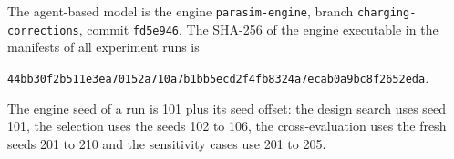 The agent-based model is the engine \texttt{parasim-engine}, branch \texttt{charging-corrections}, commit \texttt{fd5e946}. The SHA-256 of the engine executable in the manifests of all experiment runs is
\begin{center}
    \texttt{44bb30f2b511e3ea70152a710a7b1bb5ecd2f4fb8324a7ecab0a9bc8f2652eda}.
\end{center}
\noindent The engine seed of a run is 101 plus its seed offset: the design search uses seed 101, the selection uses the seeds 102 to 106, the cross-evaluation uses the fresh seeds 201 to 210 and the sensitivity cases use 201 to 205.
